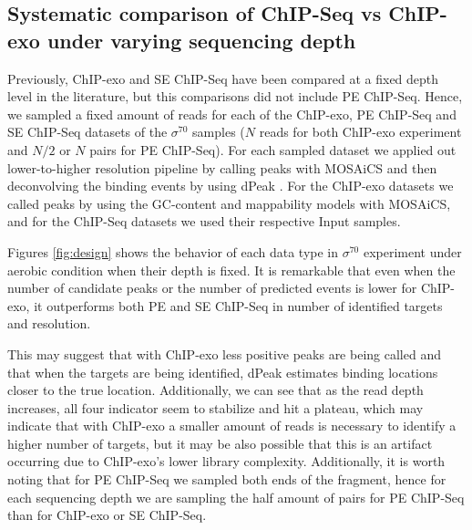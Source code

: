 \documentclass{bmcart}\usepackage[]{graphicx}\usepackage[]{color}
\newcommand{\sig}{\sigma^{70}}
\begin{document}
\subsection{Systematic comparison of ChIP-Seq vs ChIP-exo under
  varying sequencing depth}

Previously, ChIP-exo and SE ChIP-Seq have been compared at a fixed
depth level in the literature, but this comparisons did not include PE
ChIP-Seq. Hence, we sampled a fixed amount of reads for each of the
ChIP-exo, PE ChIP-Seq and SE ChIP-Seq datasets of the $\sig$ samples
($N$ reads for both ChIP-exo experiment and $N/2$ or $N$ pairs for PE
ChIP-Seq). For each sampled dataset we applied out lower-to-higher
resolution pipeline by calling peaks with MOSAiCS \cite{mosaics} and
then deconvolving the binding events by using dPeak \cite{dpeak}. For
the ChIP-exo datasets we called peaks by using the GC-content and
mappability models with MOSAiCS, and for the ChIP-Seq datasets we used
their respective Input samples.

Figures \ref{fig:design} shows the behavior of each data type in
$\sig$ experiment under aerobic condition when their depth is
fixed. It is remarkable that even when the number of candidate peaks
or the number of predicted events is lower for ChIP-exo, it
outperforms both PE and SE ChIP-Seq in number of identified targets
and resolution. 

This may suggest that with ChIP-exo less positive peaks are being
called and that when the targets are being identified, dPeak estimates
binding locations closer to the true location. Additionally, we can
see that as the read depth increases, all four indicator seem to
stabilize and hit a plateau, which may indicate that with ChIP-exo a
smaller amount of reads is necessary to identify a higher number of
targets, but it may be also possible that this is an artifact occurring
due to ChIP-exo's lower library complexity. Additionally, it is worth
noting that for PE ChIP-Seq we sampled both ends of the fragment,
hence for each sequencing depth we are sampling the half amount of
pairs for PE ChIP-Seq than for ChIP-exo or SE ChIP-Seq.
\end{document}
